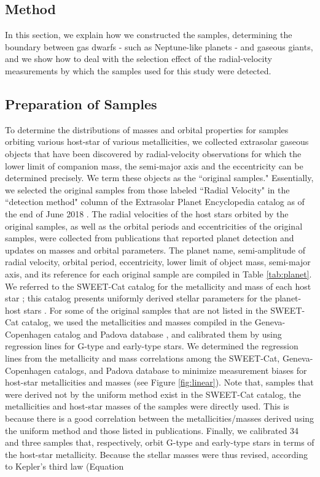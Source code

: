 \documentclass[twocolumn]{aastex62}
\begin{document}
\begin{CJK*}{UTF8}{min}
\section{Method} \label{sec:method}

In this section, we explain how we constructed the samples, determining the boundary between gas dwarfs - such as Neptune-like planets - and gaseous giants, and we show how to deal with the selection effect of the radial-velocity measurements by which the samples used for this study were detected.


\subsection{Preparation of Samples} \label{subsec:preparation}

To determine the distributions of masses and orbital properties for samples orbiting various host-star of various metallicities, we collected extrasolar gaseous objects that have been discovered by radial-velocity observations for which the lower limit of companion mass, the semi-major axis and the eccentricity can be determined precisely. We term these objects as the ``original samples." Essentially, we selected the original samples from those labeled ``Radial Velocity" in the ``detection method" column of the Extrasolar Planet Encyclopedia catalog as of the end of June 2018 \citep{2011A&A...532A..79S}. The radial velocities of the host stars orbited by the original samples, as well as the orbital periods and eccentricities of the original samples, were collected from publications that reported planet detection and updates on masses and orbital parameters. The planet name, semi-amplitude of radial velocity, orbital period, eccentricity, lower limit of object mass, semi-major axis, and its reference for each original sample are compiled in Table \ref{tab:planet}. We referred to the SWEET-Cat catalog for the metallicity and mass of each host star \citep{2013A&A...556A.150S, 2018A&A...620A..58S}; this catalog presents uniformly derived stellar parameters for the planet-host stars \citep{2008A&A...487..373S}. For some of the original samples that are not listed in the SWEET-Cat catalog, we used the metallicities and masses compiled in the Geneva-Copenhagen catalog \citep{2011A&A...530A.138C} and Padova database \citep{2000A&AS..141..371G}, and calibrated them by using regression lines for G-type and early-type stars. We determined the regression lines from the metallicity and mass correlations among the SWEET-Cat, Geneva-Copenhagen catalogs, and Padova database to minimize measurement biases for host-star metallicities and masses (see Figure \ref{fig:linear}). Note that, samples that were derived not by the uniform method \citep{2008A&A...487..373S} exist in the SWEET-Cat catalog, the metallicities and host-star masses of the samples were directly used. This is because there is a good correlation between the metallicities/masses derived using the uniform method and those listed in publications. Finally, we calibrated 34 and three samples that, respectively, orbit G-type and early-type stars in terms of the host-star metallicity. Because the stellar masses were thus revised, according to Kepler's third law (Equation 
\end{CJK*}
\end{document}
